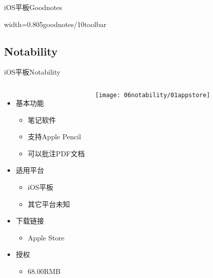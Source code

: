 \documentclass[fontset = none, t, aspectratio=169]{ctexbeamer}
\begin{document}
\begin{frame}{iOS平板}{Goodnotes}
\begin{center}
\begin{annotationimage}{width=0.8\textwidth}{05goodnotes/10toolbar}
    \end{annotationimage}
  \end{center}
\end{frame}

\subsection{Notability}
\begin{frame}{iOS平板}{Notability}
  \begin{columns}[c]
    \begin{itemize}\itemsep=3pt
    \item 基本功能
      \begin{itemize}
      \item 笔记软件
      \item 支持Apple Pencil
      \item 可以\alert{批注}PDF文档
      \end{itemize}
    \item 适用平台
      \begin{itemize}
      \item iOS平板
      \item 其它平台未知
      \end{itemize}
    \item 下载链接
      \begin{itemize}
      \item Apple Store
      \end{itemize}
    \item 授权
      \begin{itemize}
      \item \alert{68.00RMB}
      \end{itemize}
    \end{itemize}
    \texttt{[image: 06notability/01appstore]}
  \end{columns}
\end{frame}
\end{document}
